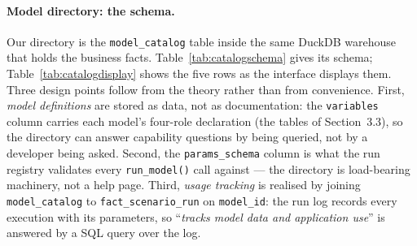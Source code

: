 \paragraph{Model directory: the schema.}
Our directory is the \texttt{model\_catalog} table inside the same DuckDB warehouse that holds the business facts. Table~\ref{tab:catalogschema} gives its schema; Table~\ref{tab:catalogdisplay} shows the five rows as the interface displays them. Three design points follow from the theory rather than from convenience. First, \emph{model definitions} are stored as data, not as documentation: the \texttt{variables} column carries each model's four-role declaration (the tables of Section~3.3), so the directory can answer capability questions by being queried, not by a developer being asked. Second, the \texttt{params\_schema} column is what the run registry validates every \texttt{run\_model()} call against --- the directory is load-bearing machinery, not a help page. Third, \emph{usage tracking} is realised by joining \texttt{model\_catalog} to \texttt{fact\_scenario\_run} on \texttt{model\_id}: the run log records every execution with its parameters, so ``\emph{tracks model data and application use}'' is answered by a SQL query over the log.

